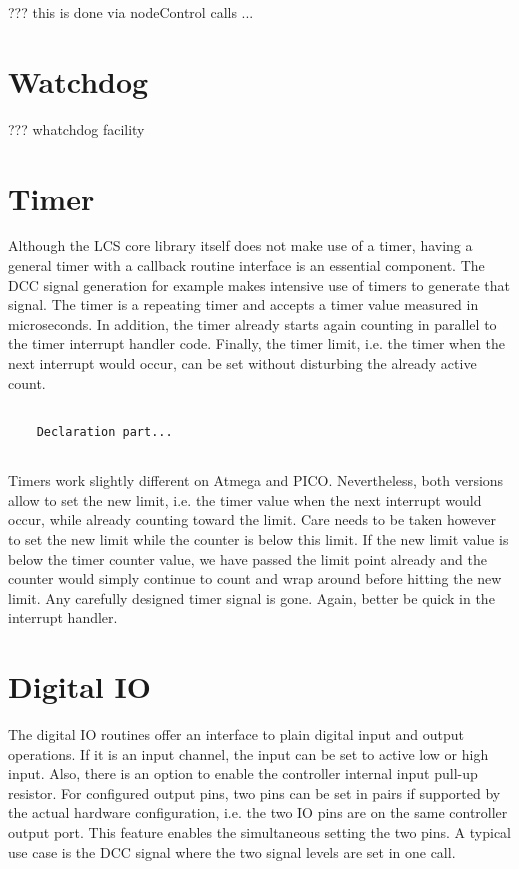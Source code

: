 ??? this is done via nodeControl calls ...

\section{Watchdog}

??? whatchdog facility


\section{Timer}

Although the LCS core library itself does not make use of a timer, having a general timer with a callback routine interface is an essential component. The DCC signal generation for example makes intensive use of timers to generate that signal. The timer is a repeating timer and accepts a timer value measured in microseconds. In addition, the timer already starts again counting in parallel to the timer interrupt handler code. Finally, the timer limit, i.e. the timer when the next interrupt would occur, can be set without disturbing the already active count.

\lstset{language=c++, style=codesnippetstyle}
\begin{lstlisting}
   
    Declaration part...
    
\end{lstlisting}

Timers work slightly different on Atmega and PICO. Nevertheless, both versions allow to set the new limit, i.e. the timer value when the next interrupt would occur, while already counting toward the limit. Care needs to be taken however to set the new limit while the counter is below this limit. If the new limit value is below the timer counter value, we have passed the limit point already and the counter would simply continue to count and wrap around before hitting the new limit. Any carefully designed timer signal is gone. Again, better be quick in the interrupt handler.

\section{Digital IO}

The digital IO routines offer an interface to plain digital input and output operations. If it is an input channel, the input can be set to active low or high input. Also, there is an option to enable the controller internal input pull-up resistor. For configured output pins, two pins can be set in pairs if supported by the actual hardware configuration, i.e. the two IO pins are on the same controller output port. This feature enables the simultaneous setting the two pins. A typical use case is the DCC signal where the two signal levels are set in one call.

